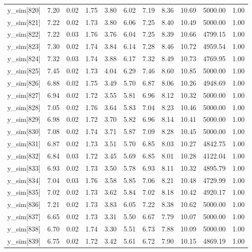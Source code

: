 \begin{table}[ht]
\begin{tabular}{rrrrrrrrrrr}
  y\_sim[820] & 7.20 & 0.02 & 1.75 & 3.80 & 6.02 & 7.19 & 8.36 & 10.69 & 5000.00 & 1.00 \\ 
  y\_sim[821] & 7.22 & 0.02 & 1.73 & 3.80 & 6.06 & 7.25 & 8.40 & 10.49 & 5000.00 & 1.00 \\ 
  y\_sim[822] & 7.22 & 0.03 & 1.76 & 3.76 & 6.04 & 7.25 & 8.39 & 10.66 & 4799.15 & 1.00 \\ 
  y\_sim[823] & 7.30 & 0.02 & 1.74 & 3.84 & 6.14 & 7.28 & 8.46 & 10.72 & 4959.54 & 1.00 \\ 
  y\_sim[824] & 7.32 & 0.03 & 1.74 & 3.88 & 6.17 & 7.32 & 8.49 & 10.73 & 4769.95 & 1.00 \\ 
  y\_sim[825] & 7.45 & 0.02 & 1.73 & 4.04 & 6.29 & 7.46 & 8.60 & 10.85 & 5000.00 & 1.00 \\ 
  y\_sim[826] & 6.88 & 0.02 & 1.75 & 3.49 & 5.70 & 6.87 & 8.06 & 10.26 & 4948.69 & 1.00 \\ 
  y\_sim[827] & 6.94 & 0.02 & 1.72 & 3.55 & 5.81 & 6.96 & 8.12 & 10.32 & 5000.00 & 1.00 \\ 
  y\_sim[828] & 7.05 & 0.02 & 1.76 & 3.64 & 5.83 & 7.04 & 8.23 & 10.46 & 5000.00 & 1.00 \\ 
  y\_sim[829] & 6.98 & 0.02 & 1.72 & 3.70 & 5.82 & 6.96 & 8.14 & 10.41 & 5000.00 & 1.00 \\ 
  y\_sim[830] & 7.08 & 0.02 & 1.74 & 3.71 & 5.87 & 7.09 & 8.28 & 10.45 & 5000.00 & 1.00 \\ 
  y\_sim[831] & 6.87 & 0.02 & 1.73 & 3.51 & 5.70 & 6.85 & 8.03 & 10.27 & 4842.75 & 1.00 \\ 
  y\_sim[832] & 6.84 & 0.03 & 1.72 & 3.45 & 5.69 & 6.85 & 8.01 & 10.28 & 4122.04 & 1.00 \\ 
  y\_sim[833] & 6.93 & 0.02 & 1.73 & 3.50 & 5.78 & 6.93 & 8.11 & 10.32 & 4895.79 & 1.00 \\ 
  y\_sim[834] & 7.04 & 0.03 & 1.76 & 3.58 & 5.85 & 7.06 & 8.21 & 10.48 & 4729.99 & 1.00 \\ 
  y\_sim[835] & 7.02 & 0.02 & 1.73 & 3.62 & 5.84 & 7.02 & 8.18 & 10.42 & 4920.17 & 1.00 \\ 
  y\_sim[836] & 7.21 & 0.02 & 1.73 & 3.83 & 6.05 & 7.22 & 8.38 & 10.62 & 5000.00 & 1.00 \\ 
  y\_sim[837] & 6.65 & 0.02 & 1.73 & 3.31 & 5.50 & 6.67 & 7.79 & 10.07 & 5000.00 & 1.00 \\ 
  y\_sim[838] & 6.70 & 0.02 & 1.74 & 3.30 & 5.51 & 6.73 & 7.88 & 10.09 & 5000.00 & 1.00 \\ 
  y\_sim[839] & 6.75 & 0.02 & 1.72 & 3.42 & 5.61 & 6.72 & 7.90 & 10.15 & 4869.19 & 1.00 \\ 

\end{tabular}
\end{table}
